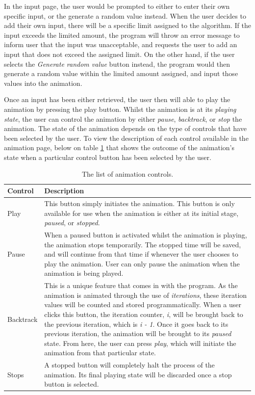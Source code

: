 In the input page, the user would be prompted to either to enter their own specific input, or the generate a random value instead. When the user decides to add their own input, there will be a specific limit assigned to the algorithm. If the input exceeds the limited amount, the program will throw an error message to inform user that the input was unacceptable, and requests the user to add an input that does not exceed the assigned limit. On the other hand, if the user selects the \textit{Generate random value} button instead, the program would then generate a random value within the limited amount assigned, and input those values into the animation.

Once an input has been either retrieved, the user then will able to play the animation by pressing the play button. Whilst the animation is at its \textit{playing state}, the user can control the animation by either \textit{pause}, \textit{backtrack}, or \textit{stop} the animation. The state of the animation depends on the type of controls that have been selected by the user. To view the description of each control available in the animation page, below on table \ref{tab:animationControls} that shows the outcome of the animation's state when a particular control button has been selected by the user.

\begin{table}[H]
\caption{The list of animation controls.}
\begin{center}
\begin{tabular}{| p{4cm} | p{11cm} |}
		\hline
		\textbf{Control} & \textbf{Description} \\ \hline
		Play & This button simply initiates the animation. This button is only available for use when the animation is either at its initial stage, \textit{paused}, or \textit{stopped}. \\ \hline
     Pause & When a paused button is activated whilst the animation is playing, the animation stops temporarily. The stopped time will be saved, and will continue from that time if whenever the user chooses to play the animation. User can only pause the animation when the animation is being played. \\ \hline
     Backtrack &  This is a unique feature that comes in with the program. As the animation is animated through the use of \textit{iterations}, these iteration values will be counted and stored programmatically. When a user clicks this button, the iteration counter, \textit{i}, will be brought back to the previous iteration, which is \textit{i - 1}. Once it goes back to its previous iteration, the animation will be brought to its \textit{paused} state. From here, the user can press \textit{play}, which will initiate the animation from that particular state. \\ \hline
     Stops &  A stopped button will completely halt the process of the animation. Its final playing state will be discarded once a stop button is selected. \\ \hline
\end{tabular}
\end{center}
\label{tab:animationControls}
\end{table}

